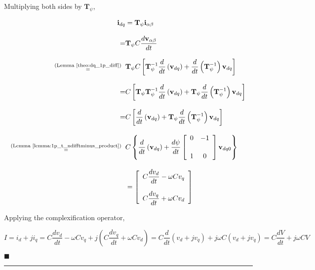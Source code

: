 	Multiplying both sides by $\mathbf{T}_{\psi}$,

\begin{align}
	\mathbf{i}_{dq} &= \mathbf{T}_\psi \mathbf{i}_{\alpha\beta} \nonumber\\[3mm]
	=& \mathbf{T}_\psi C\dfrac{d\mathbf{v}_{\alpha\beta}}{dt} \nonumber\\[3mm] 
	\substack{\text{(Lemma \ref{theo:dq_1p_diff})} \\ =}\hspace{2mm}& \mathbf{T}_\psi C\left[ \mathbf{T}^{-1}_\psi \dfrac{d}{dt}\left(\mathbf{v}_{dq}\right) + \dfrac{d}{dt}\left(\mathbf{T}^{-1}_\psi \right) \mathbf{v}_{dq} \right] \nonumber\\[3mm] 
	=& C\left[ \mathbf{T}_\psi \mathbf{T}^{-1}_\psi \dfrac{d}{dt}\left(\mathbf{v}_{dq}\right) + \mathbf{T}_\psi \dfrac{d}{dt}\left(\mathbf{T}^{-1}_\psi \right) \mathbf{v}_{dq} \right] \nonumber\\[3mm] 
	=& C\left[ \dfrac{d}{dt}\left(\mathbf{v}_{dq}\right) + \mathbf{T}_{\psi}\dfrac{d}{dt}\left(\mathbf{T}^{-1}_\psi \right) \mathbf{v}_{dq} \right] \nonumber\\[3mm]
	\substack{\text{(Lemma \ref{lemma:1p_t_ndifftminus_product})} \\ =}\hspace{2mm}& C\left\{ \dfrac{d}{dt}\left(\mathbf{v}_{dq}\right) + \dfrac{d\psi}{dt} \left[\begin{array}{cc}    0 & -1 \\[5mm] 1 & 0 \end{array}\right] \mathbf{v}_{dq0} \right\} \nonumber\\[3mm]
%
%
&= \left[\begin{array}{l}
        C\dfrac{dv_d}{dt} - \omega C v_q \\[5mm]
        C\dfrac{dv_q}{dt} + \omega C v_d
\end{array}\right]
\end{align}

	Applying the complexification operator,

\begin{equation} I = i_d + ji_q = C\dfrac{dv_d}{dt} - \omega C v_q + j\left(C\dfrac{dv_q}{dt} + \omega C v_d\right) = C\dfrac{d}{dt}\left(v_d + jv_q\right) + j\omega C\left(v_d + jv_q\right) = C\dfrac{dV}{dt} + j\omega C V \end{equation}

\hfill$\blacksquare$
\vspace{5mm}
\hrule
\vspace{5mm}

